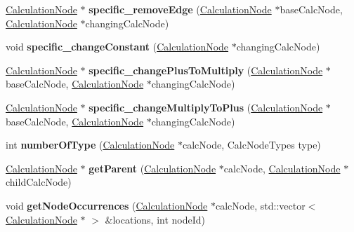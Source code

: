 \begin{DoxyCompactItemize}
\item 
\hyperlink{classCalculationNode}{Calculation\+Node} $\ast$ {\bfseries specific\+\_\+remove\+Edge} (\hyperlink{classCalculationNode}{Calculation\+Node} $\ast$base\+Calc\+Node, \hyperlink{classCalculationNode}{Calculation\+Node} $\ast$changing\+Calc\+Node)\hypertarget{classNetworkModifier_a6f72ac88702c225e881964f178d63bd7}{}\label{classNetworkModifier_a6f72ac88702c225e881964f178d63bd7}

\item 
void {\bfseries specific\+\_\+change\+Constant} (\hyperlink{classCalculationNode}{Calculation\+Node} $\ast$changing\+Calc\+Node)\hypertarget{classNetworkModifier_a826ad8a3e5fd313e1f263a8088da55fe}{}\label{classNetworkModifier_a826ad8a3e5fd313e1f263a8088da55fe}

\item 
\hyperlink{classCalculationNode}{Calculation\+Node} $\ast$ {\bfseries specific\+\_\+change\+Plus\+To\+Multiply} (\hyperlink{classCalculationNode}{Calculation\+Node} $\ast$base\+Calc\+Node, \hyperlink{classCalculationNode}{Calculation\+Node} $\ast$changing\+Calc\+Node)\hypertarget{classNetworkModifier_aec5fb3ec5702d8ec879135ed9fd3fd59}{}\label{classNetworkModifier_aec5fb3ec5702d8ec879135ed9fd3fd59}

\item 
\hyperlink{classCalculationNode}{Calculation\+Node} $\ast$ {\bfseries specific\+\_\+change\+Multiply\+To\+Plus} (\hyperlink{classCalculationNode}{Calculation\+Node} $\ast$base\+Calc\+Node, \hyperlink{classCalculationNode}{Calculation\+Node} $\ast$changing\+Calc\+Node)\hypertarget{classNetworkModifier_a26e6b75e86ad045f64368add386aa2f8}{}\label{classNetworkModifier_a26e6b75e86ad045f64368add386aa2f8}

\item 
int {\bfseries number\+Of\+Type} (\hyperlink{classCalculationNode}{Calculation\+Node} $\ast$calc\+Node, Calc\+Node\+Types type)\hypertarget{classNetworkModifier_afecca95dfe9c898fd0fe3959f6846144}{}\label{classNetworkModifier_afecca95dfe9c898fd0fe3959f6846144}

\item 
\hyperlink{classCalculationNode}{Calculation\+Node} $\ast$ {\bfseries get\+Parent} (\hyperlink{classCalculationNode}{Calculation\+Node} $\ast$calc\+Node, \hyperlink{classCalculationNode}{Calculation\+Node} $\ast$child\+Calc\+Node)\hypertarget{classNetworkModifier_a8a8b86c2086a5c9102f123be773fc6f0}{}\label{classNetworkModifier_a8a8b86c2086a5c9102f123be773fc6f0}

\item 
void {\bfseries get\+Node\+Occurrences} (\hyperlink{classCalculationNode}{Calculation\+Node} $\ast$calc\+Node, std\+::vector$<$ \hyperlink{classCalculationNode}{Calculation\+Node} $\ast$ $>$ \&locations, int node\+Id)\hypertarget{classNetworkModifier_a2a8e14daebb6761624331a6c645cbe41}{}\label{classNetworkModifier_a2a8e14daebb6761624331a6c645cbe41}

\end{DoxyCompactItemize}


